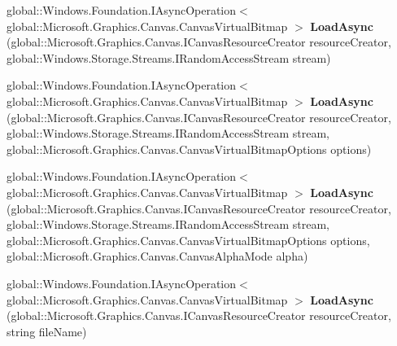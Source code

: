 \begin{DoxyCompactItemize}
\item 
\mbox{\label{interface_microsoft_1_1_graphics_1_1_canvas_1_1_i_canvas_virtual_bitmap_statics_aee81585da1cf32d9da0d24e264902778}} 
global\+::\+Windows.\+Foundation.\+I\+Async\+Operation$<$ global\+::\+Microsoft.\+Graphics.\+Canvas.\+Canvas\+Virtual\+Bitmap $>$ {\bfseries Load\+Async} (global\+::\+Microsoft.\+Graphics.\+Canvas.\+I\+Canvas\+Resource\+Creator resource\+Creator, global\+::\+Windows.\+Storage.\+Streams.\+I\+Random\+Access\+Stream stream)
\item 
\mbox{\label{interface_microsoft_1_1_graphics_1_1_canvas_1_1_i_canvas_virtual_bitmap_statics_afcb7bb816ebb415ed059fda157c6bdca}} 
global\+::\+Windows.\+Foundation.\+I\+Async\+Operation$<$ global\+::\+Microsoft.\+Graphics.\+Canvas.\+Canvas\+Virtual\+Bitmap $>$ {\bfseries Load\+Async} (global\+::\+Microsoft.\+Graphics.\+Canvas.\+I\+Canvas\+Resource\+Creator resource\+Creator, global\+::\+Windows.\+Storage.\+Streams.\+I\+Random\+Access\+Stream stream, global\+::\+Microsoft.\+Graphics.\+Canvas.\+Canvas\+Virtual\+Bitmap\+Options options)
\item 
\mbox{\label{interface_microsoft_1_1_graphics_1_1_canvas_1_1_i_canvas_virtual_bitmap_statics_a60b2049c357c42be3e7dbccef1e43260}} 
global\+::\+Windows.\+Foundation.\+I\+Async\+Operation$<$ global\+::\+Microsoft.\+Graphics.\+Canvas.\+Canvas\+Virtual\+Bitmap $>$ {\bfseries Load\+Async} (global\+::\+Microsoft.\+Graphics.\+Canvas.\+I\+Canvas\+Resource\+Creator resource\+Creator, global\+::\+Windows.\+Storage.\+Streams.\+I\+Random\+Access\+Stream stream, global\+::\+Microsoft.\+Graphics.\+Canvas.\+Canvas\+Virtual\+Bitmap\+Options options, global\+::\+Microsoft.\+Graphics.\+Canvas.\+Canvas\+Alpha\+Mode alpha)
\item 
\mbox{\label{interface_microsoft_1_1_graphics_1_1_canvas_1_1_i_canvas_virtual_bitmap_statics_a330ce31be0bdb0b0a0d703fabfad4773}} 
global\+::\+Windows.\+Foundation.\+I\+Async\+Operation$<$ global\+::\+Microsoft.\+Graphics.\+Canvas.\+Canvas\+Virtual\+Bitmap $>$ {\bfseries Load\+Async} (global\+::\+Microsoft.\+Graphics.\+Canvas.\+I\+Canvas\+Resource\+Creator resource\+Creator, string file\+Name)

\end{DoxyCompactItemize}
